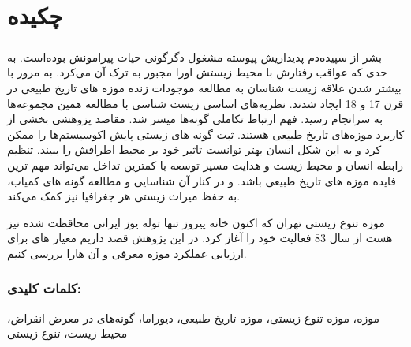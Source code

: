 
\chapter*{چکیده}

\paragraph*{}
بشر از سپیده‌دم پدیداریش پیوسته مشغول دگرگونی حیات پیرامونش بوده‌است. به حدی که عواقب رفتارش با محیط زیستش اورا مجبور به ترک آن می‌کرد. به مرور با بیشتر شدن علاقه زیست شناسان به مطالعه موجودات زنده موزه های تاریخ طبیعی در قرن 17 و 18 ایجاد شدند. 
نظریه‌های اساسی زیست شناسی با مطالعه همین مجموعه‌ها به سرانجام رسید. فهم ارتباط تکاملی گونه‌ها میسر شد. مقاصد پزوهشی بخشی از کاربرد موزه‌های تاریخ طبیعی هستند. ثبت گونه های زیستی پایش اکوسیستم‌ها را ممکن کرد و به این شکل انسان بهتر توانست تاثیر خود بر محیط اطرافش  را ببیند. تنظیم رابطه انسان و محیط زیست و هدایت مسیر توسعه با کمترین تداخل می‌تواند مهم ترین فایده موزه های تاریخ طبیعی باشد. و در کنار آن شناسایی و مطالعه گونه های کمیاب، به حفظ میراث زیستی هر جغرافیا نیز کمک می‌کند.

موزه تنوع زیستی تهران که اکنون خانه پیروز تنها توله یوز ایرانی محاقظت شده نیز هست از سال 83 فعالیت خود را آغاز کرد. 
در این پژوهش قصد داریم معیار های برای ارزیابی عملکرد موزه معرفی و آن هارا بررسی کنیم.
\subsection*{کلمات کلیدی:}
موزه، موزه تنوع زیستی، موزه تاریخ طبیعی، دیوراما، گونه‌های در معرض انقراض، محیط زیست، تنوع زیستی

